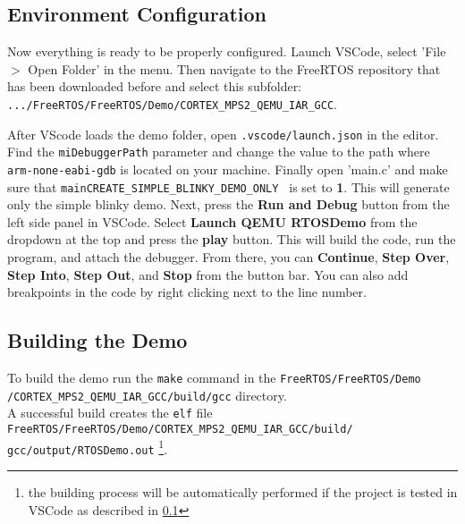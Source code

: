 \subsection{Environment Configuration}
\label{subsec:Environment Configuration}
Now everything is ready to be properly configured. Launch VSCode, select 'File $>$ Open Folder' in the menu. Then navigate to the FreeRTOS repository that has been downloaded before and select this subfolder: \texttt{.../FreeRTOS/FreeRTOS/Demo/CORTEX\_MPS2\_QEMU\_IAR\_GCC}.

After VScode loads the demo folder, open \texttt{.vscode/launch.json} in the editor. Find the \texttt{miDebuggerPath} parameter and change the value to the path where \texttt{arm-none-eabi-gdb} is located on your machine. Finally open 'main.c' and make sure that \texttt{mainCREATE\_SIMPLE\_BLINKY\_DEMO\_ONLY } is set to \textbf{1}. This will generate only the simple blinky demo. Next, press the \textbf{Run and Debug} button from the left side panel in VSCode. Select \textbf{Launch QEMU RTOSDemo} from the dropdown at the top and press the \textbf{play} button. This will build the code, run the program, and attach the debugger. From there, you can \textbf{Continue}, \textbf{Step Over}, \textbf{Step Into}, \textbf{Step Out}, and \textbf{Stop } from the button bar. You can also add breakpoints in the code by right clicking next to the line number.

\subsection{Building the Demo}
\label{subsec: Building the Demo}
To build the demo run the \texttt{make} command in the \texttt{FreeRTOS/FreeRTOS/Demo} \\\texttt{/CORTEX\_MPS2\_QEMU\_IAR\_GCC/build/gcc} directory. \\
A successful build creates the \texttt{elf} file \texttt{FreeRTOS/FreeRTOS/Demo/CORTEX\_MPS2\_QEMU\_IAR\_GCC/build/} \\
\texttt{gcc/output/RTOSDemo.out} \footnote{the building process will be automatically performed if the project is tested in VSCode as described in \ref{subsec:Environment Configuration}}.



\newpage

